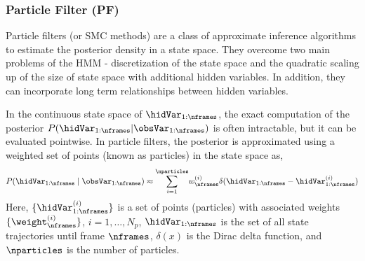 \subsubsection{Particle Filter (PF)}
Particle filters (or \gls{SMC} methods) are a class of approximate inference algorithms to estimate the posterior density in a state space. They overcome two main problems of the \gls{HMM} - discretization of the state space and the quadratic scaling up of the size of state space with additional hidden variables. In addition, they can incorporate long term relationships between hidden variables. 

In the continuous state space of $\hidVar_{1:\nframes}$, the exact computation of the posterior $P(\hidVar_{1:\nframes}|\obsVar_{1:\nframes})$ is often intractable, but it can be evaluated pointwise. In particle filters, the posterior is approximated using a weighted set of points (known as particles) in the state space as,
\begin{equation}\label{eqn:bpm:pfposterior}
P(\hidVar_{1:\nframes} \mid \obsVar_{1:\nframes})\approx\overset{\nparticles}{\underset{i=1}{\sum}}w_{\nframes}^{(i)}\delta(\hidVar_{1:\nframes}-\hidVar_{1:\nframes}^{(i)})
\end{equation}
Here, $\{\hidVar^{(i)}_{1:\nframes}\}$ is a set of points (particles) with associated weights $\{\weight_{\nframes}^{(i)}\}$, $i = 1,\ldots,N_p$, $\hidVar_{1:\nframes}$ is the set of all state trajectories until frame $\nframes$, $\delta(x)$ is the Dirac delta function, and $\nparticles$ is the number of particles. 

